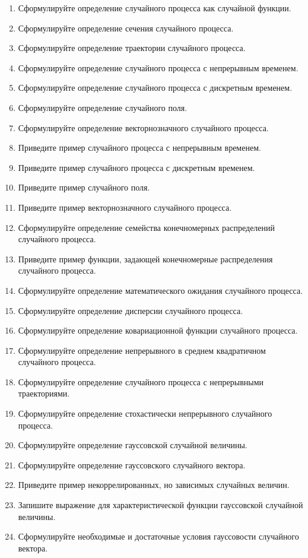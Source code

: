 \documentclass[a4paper,12pt]{extreport}
\renewcommand{\=}[1]{\stackrel{#1}{=}} %
\begin{document}
\begin{enumerate}
	\item Сформулируйте определение случайного процесса как случайной функции.
	\item Сформулируйте определение сечения случайного процесса.
	\item Сформулируйте определение траектории случайного процесса.

	\item Сформулируйте определение случайного процесса с непрерывным временем.
	\item Сформулируйте определение случайного процесса с дискретным временем.
	\item Сформулируйте определение случайного поля.
	\item Сформулируйте определение векторнозначного случайного процесса.

	\item Приведите пример случайного процесса с непрерывным временем.
	\item Приведите пример случайного процесса с дискретным временем.
	\item Приведите пример случайного поля.
	\item Приведите пример векторнозначного случайного процесса.

	\item Сформулируйте определение семейства конечномерных распределений случайного процесса.
	\item Приведите пример функции, задающей конечномерные распределения случайного процесса.

	\item Сформулируйте определение математического ожидания случайного процесса.
	\item Сформулируйте определение дисперсии случайного процесса.
	\item Сформулируйте определение ковариационной функции случайного процесса.
	
	\item Сформулируйте определение непрерывного в среднем квадратичном случайного процесса.
	\item Сформулируйте определение случайного процесса с непрерывными траекториями.
	\item Сформулируйте определение стохастически непрерывного случайного процесса.

	\item Сформулируйте определение гауссовской случайной величины.
	\item Сформулируйте определение гауссовского случайного вектора.
	\item Приведите пример некоррелированных, но зависимых случайных величин.
	\item Запишите выражение для характеристической функции гауссовской
	случайной величины.
	\item Сформулируйте необходимые и достаточные условия гауссовости случайного вектора.


\end{enumerate}
\end{document}
